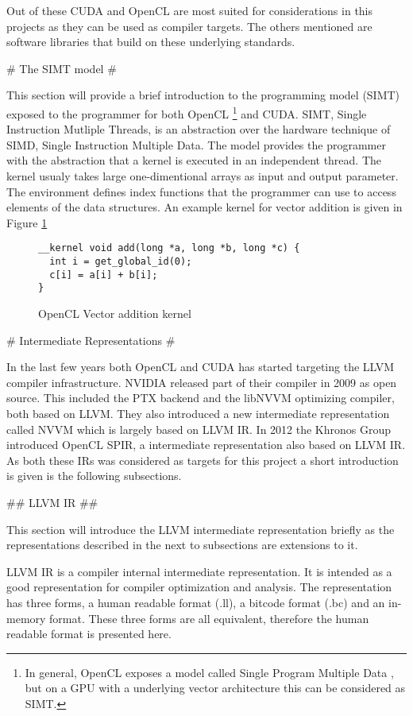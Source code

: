 \begin{markdown}
Out of these CUDA and OpenCL are most suited for considerations in
this projects as they can be used as compiler targets. The others
mentioned are software libraries that build on these underlying
standards.

# The SIMT model #

This section will provide a brief introduction to the programming
model (SIMT) exposed to the programmer for both OpenCL \footnote{In
  general, OpenCL exposes a model called Single Program Multiple Data
  \cite{}, but on a GPU with a underlying vector architecture this can
  be considered as SIMT.} and CUDA. SIMT, Single Instruction Mutliple
Threads, is an abstraction over the hardware technique of SIMD, Single
Instruction Multiple Data. The model provides the programmer with the
abstraction that a kernel is executed in an independent thread. The
kernel usualy takes large one-dimentional arrays as input and output
parameter. The environment defines index functions that the programmer
can use to access elements of the data structures. An example kernel
for vector addition is given in Figure \ref{smit:add}


\begin{figure}[H]
  \begin{verbatim}
__kernel void add(long *a, long *b, long *c) {
  int i = get_global_id(0);
  c[i] = a[i] + b[i];
}
  \end{verbatim}
  \caption{OpenCL Vector addition kernel}
  \label{smit:add}
\end{figure}


# Intermediate Representations #

In the last few years both OpenCL and CUDA has started targeting the
LLVM compiler infrastructure. NVIDIA released part of their compiler
in 2009 as open source. This included the PTX backend and the libNVVM
optimizing compiler, both based on LLVM. They also introduced a new
intermediate representation called NVVM which is largely based on LLVM
IR. In 2012 the Khronos Group introduced OpenCL SPIR, a intermediate
representation also based on LLVM IR. As both these IRs was considered
as targets for this project a short introduction is given is the
following subsections. 

## LLVM IR ##

This section will introduce the LLVM intermediate representation
briefly as the representations described in the next to subsections
are extensions to it.

LLVM IR is a compiler internal intermediate representation. It is
intended as a good representation for compiler optimization and
analysis. The representation has three forms, a human readable format
(.ll), a bitcode format (.bc) and an in-memory format. These three
forms are all equivalent, therefore the human readable format is
presented here.


\end{markdown}

